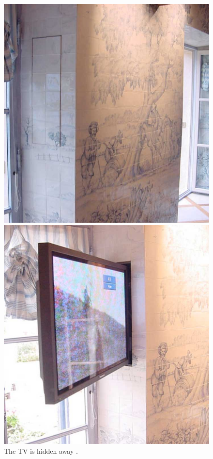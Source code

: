 \begin{figure}[h]
	\centering
	\begin{minipage}[b]{.44\textwidth}
		\centering
		\includegraphics[width=\linewidth]{figures/adhoc/dubai-notv}
		\caption{The TV is hidden away \citep{lynggaard2012had}.}
		\label{fig:ch:adhoc:dubai-notv}
	\end{minipage}
	\hspace{0.02\textwidth}
	\begin{minipage}[b]{.44\textwidth}
		\centering
		\includegraphics[width=\linewidth]{figures/adhoc/dubai-tv}

\end{minipage}
\end{figure}

